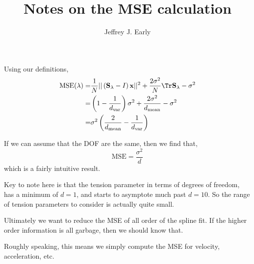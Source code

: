 \documentclass[11pt]{article}
\title{Notes on the MSE calculation}
\author{Jeffrey J. Early}
\begin{document}
\maketitle

Using our definitions,
\begin{align}
    \textrm{MSE}(\lambda) =& \frac{1}{N} || \left( \mathbf{S_\lambda} - I \right) \mathbf{x} ||^2 + \frac{2 \sigma^2}{N}  \Tr \mathbf{S_\lambda} - \sigma^2 \\
    =&  \left(1-\frac{1}{d_{\textrm{var}}} \right)\sigma^2 + \frac{2 \sigma^2}{d_\textrm{mean}} - \sigma^2 \\
    =& \sigma^2 \left( \frac{2}{d_\textrm{mean}} -\frac{1}{d_{\textrm{var}}} \right)
\end{align}

If we can assume that the DOF are the same, then we find that,
\begin{equation}
    \textrm{MSE} = \frac{\sigma^2}{d}
\end{equation}
which is a fairly intuitive result.

Key to note here is that the tension parameter in terms of degrees of freedom, has a minimum of $d=1$, and starts to asymptote much past $d=10$. So the range of tension parameters to consider is actually quite small.

Ultimately we want to reduce the MSE of all order of the spline fit. If the higher order information is all garbage, then we should know that.

Roughly speaking, this means we simply compute the MSE for velocity, acceleration, etc.
\end{document}
